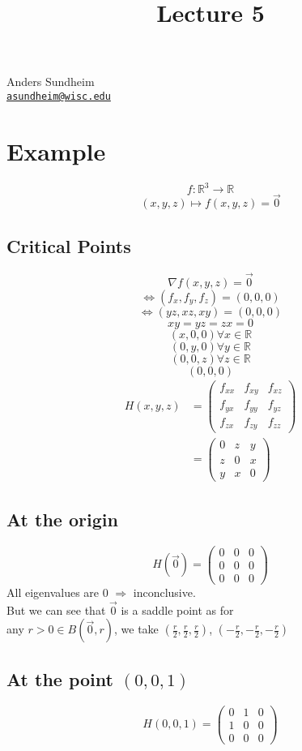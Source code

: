 \documentclass[12pt]{article}
\title{Lecture 5}
\newcommand{\BR}{\mathbb R}
\begin{document}
\maketitle
\vspace*{-0.25in}
\begin{center}
	Anders Sundheim \\
	\href{mailto:asundheim@wisc.edu}{{\tt asundheim@wisc.edu}}
\end{center}
\section*{Example}
\[ f:\BR^3\rightarrow\BR \]
\[ (x,y,z)\mapsto f(x,y,z)=\vec{0} \]
\subsection*{Critical Points}
\[ \nabla f(x,y,z)=\vec{0} \]
\[ \iff (f_x,f_y,f_z)=(0,0,0) \]
\[ \iff (yz,xz,xy)=(0,0,0) \]
\[ xy = yz = zx = 0 \]
\[ (x,0,0)\forall x\in\BR \]
\[ (0,y,0)\forall y\in\BR \]
\[ (0,0,z)\forall z\in\BR \]
\[ (0,0,0) \]
\begin{align*}
  H(x,y,z) & =
  \begin{pmatrix*}
    f_{xx} & f_{xy} & f_{xz} \\
    f_{yx} & f_{yy} & f_{yz} \\
    f_{zx} & f_{zy} & f_{zz}
  \end{pmatrix*} \\
  & =
  \begin{pmatrix*}
    0 & z & y \\
    z & 0 & x \\
    y & x & 0
  \end{pmatrix*}
\end{align*}
\subsection*{At the origin}
\[ H(\vec{0}) =
\begin{pmatrix*}
  0 & 0 & 0 \\
  0 & 0 & 0 \\
  0 & 0 & 0
\end{pmatrix*}
\]
All eigenvalues are 0 $\Rightarrow$ inconclusive. \\
But we can see that $\vec{0}$ is a saddle point as for \\
any $r>0\in B(\vec{0},r)$, we take $(\frac{r}{2},\frac{r}{2},\frac{r}{2})$, $(-\frac{r}{2},-\frac{r}{2},-\frac{r}{2})$ \\
\subsection*{At the point $(0,0,1)$}
\[ H(0,0,1) =
\begin{pmatrix*}
  0 & 1 & 0 \\
  1 & 0 & 0 \\
  0 & 0 & 0
\end{pmatrix*}
\]
\end{document}
